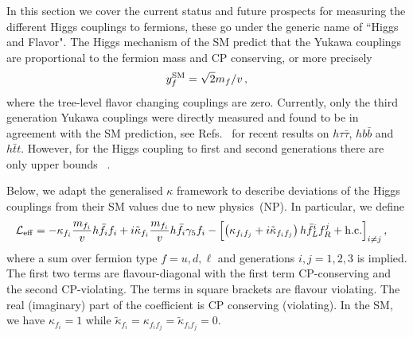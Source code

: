 \documentclass[../report.tex]{subfiles}
\begin{document}
\label{sec7}


In this section we cover the current status and future prospects for measuring the different Higgs couplings to fermions, these go under the generic name of ``Higgs and Flavor". 
The Higgs mechanism of the SM predict that the Yukawa couplings are proportional to the fermion mass and CP conserving, or more precisely 
%
\begin{align}
    y^{\rm SM}_f = \sqrt{2} m_f / v \, ,
\end{align}
%
where the tree-level flavor changing couplings are zero.  Currently,
only the third generation Yukawa couplings were directly measured and
found to be in agreement with the SM prediction, see
Refs.~\cite{Aad:2015vsa,Aaboud:2018pen,Sirunyan:2018kst,Aaboud:2018zhk,
  Aaboud:2017jvq,Aaboud:2018urx,Sirunyan:2018shy} for recent results
on $h\tau\bar{\tau}$, $h b\bar{b}$ and $h \bar{t} t$.  However, for
the Higgs coupling to first and second generations there are only
upper bounds
~\cite{Aaboud:2018fhh,Aaboud:2017ojs,Perez:2015aoa,Altmannshofer:2015qra,
  Kagan:2014ila}.

Below, we adapt the generalised $\kappa$ framework to describe deviations of the Higgs couplings from their SM values due to new physics~(NP).
In particular, we define 
%
\begin{equation}
\label{eq:L_eff}
\begin{split}
	\mathcal{L}_{\rm eff} &= -\kappa_{f_i} \frac{m_{f_i}}{v} h \bar f_i f_i + i \tilde \kappa_{f_i} \frac{m_{f_i}}{v} h \bar f_i \gamma_5 f_i  
	- \left[\left( \kappa_{f_i f_j} + i \tilde \kappa_{f_i f_j} \right) h \bar f_L^i f_R^j +{\rm h.c.}\right]_{i\neq j}, 
\end{split}
\end{equation}
%
where a sum over fermion type $f=u,d,\ell$ and generations $i,j=1,2,3$ is implied.
The first two terms are flavour-diagonal with the first term CP-conserving and
the second CP-violating.  The terms in square brackets are flavour
violating. The real (imaginary) part of the coefficient is CP
conserving (violating). In the SM, we have $\kappa_{f_i}=1$ while $\tilde
\kappa_{f_i}=\kappa_{{f_i}{f_j}}=\tilde \kappa_{{f_i}{f_j}}=0$.
\end{document}
